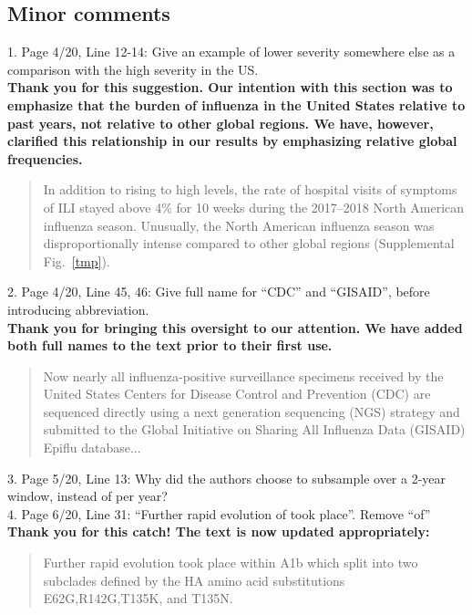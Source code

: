 \documentclass[11pt,oneside,letterpaper]{article}
\begin{document}
\subsection*{Minor comments}
1. Page 4/20, Line 12-14: Give an example of lower severity somewhere else as a comparison with the high severity in the US.\\

\textbf{Thank you for this suggestion. Our intention with this section was to emphasize that the burden of influenza in the United States relative to past years, not relative to other global regions. We have, however, clarified this relationship in our results by emphasizing relative global frequencies.}

\begin{quotation}
  In addition to rising to high levels, the rate of hospital visits of symptoms of ILI stayed above 4\% for 10 weeks during the 2017--2018 North American influenza season.
  Unusually, the North American influenza season was disproportionally intense compared to other global regions (Supplemental Fig.~\ref{tmp}).
\end{quotation}

2. Page 4/20, Line 45, 46: Give full name for “CDC” and “GISAID”, before introducing abbreviation.\\

\textbf{Thank you for bringing this oversight to our attention. We have added both full names to the text prior to their first use.}

\begin{quotation}
Now nearly all influenza-positive surveillance specimens received by the United States Centers for Disease Control and Prevention (CDC) are sequenced directly using a next generation sequencing (NGS) strategy and submitted to the Global Initiative on Sharing All Influenza Data (GISAID) Epiflu database...
\end{quotation}

3. Page 5/20, Line 13: Why did the authors choose to subsample over a 2-year window, instead of per year?\\

4. Page 6/20, Line 31: “Further rapid evolution of took place”. Remove “of”\\

\textbf{Thank you for this catch! The text is now updated appropriately:}

\begin{quotation}
  Further rapid evolution took place within A1b which split into two subclades defined by the HA amino acid substitutions E62G,R142G,T135K, and T135N.
\end{quotation}
\end{document}
